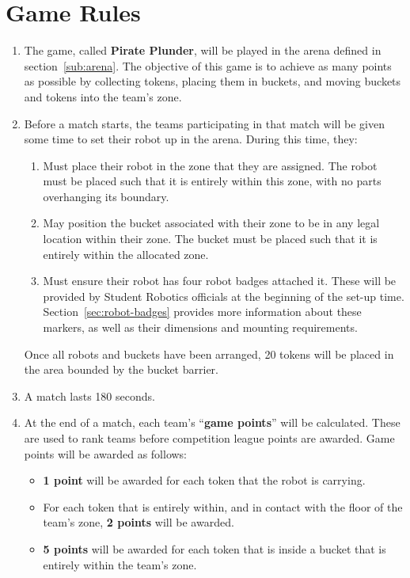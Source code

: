 \section {Game Rules}
\label{game-rules}

\begin{enumerate}
\item The game, called \textbf{Pirate Plunder}, will be played in the arena defined in section~\ref{sub:arena}.
      The objective of this game is to achieve as many points as possible by collecting tokens,
       placing them in buckets, and moving buckets and tokens into the team's zone.

\item Before a match starts, the teams participating in that match will be given some time to set their robot up in the arena.
      During this time, they:
\begin{enumerate}
  \item Must place their robot in the zone that they are assigned.
        The robot must be placed such that it is entirely within this zone, with no parts overhanging its boundary.

  \item May position the bucket associated with their zone to be in any legal location within their zone.
        The bucket must be placed such that it is entirely within the allocated zone.

  \item Must ensure their robot has four robot badges attached it.
        These will be provided by Student Robotics officials at the beginning of the set-up time.
        Section~\ref{sec:robot-badges} provides more information about these markers, as well as their dimensions and mounting requirements.
\end{enumerate}
      Once all robots and buckets have been arranged, 20 tokens will be placed in the area bounded by the bucket barrier.

\item A match lasts 180 seconds.

\item At the end of a match, each team's ``\textbf{game points}'' will be calculated.
      These are used to rank teams before competition league points are awarded.
      Game points will be awarded as follows:
\begin{itemize}
  \item \textbf{1 point} will be awarded for each token that the robot is carrying.
  \item For each token that is entirely within, and in contact with the floor of the team's zone, \textbf{2 points} will be awarded.
  \item \textbf{5 points} will be awarded for each token that is inside a bucket that is entirely within the team's zone.


\end{itemize}
\end{enumerate}
